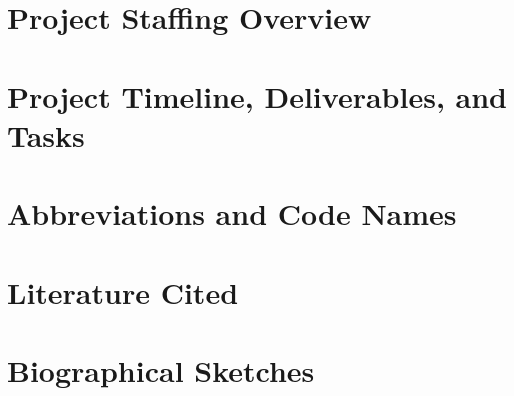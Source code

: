 \documentclass{DOEproposal}
\begin{document}
    \section{Project Staffing Overview}
        \label{sec:staffing}
        
    \newpage

    \section{Project Timeline, Deliverables, and Tasks}
        \label{sec:timetable}
        
    \newpage


    \section{Abbreviations and Code Names}
        \label{sec:abbreviations}
        
    \newpage

    \section{Literature Cited}
        \label{sec:references}
        
    \newpage
   

    \section{Biographical Sketches}
        \label{sec:biosketches}
        
    
\end{document}
